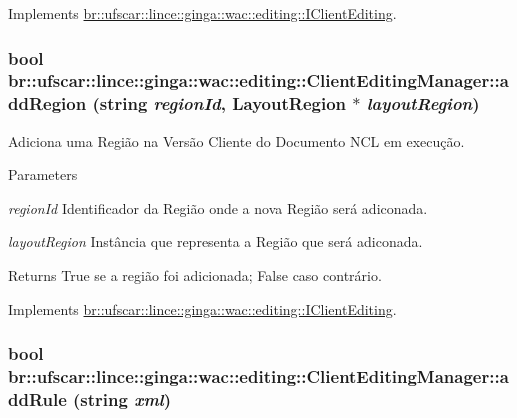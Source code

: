 Implements \hyperlink{classbr_1_1ufscar_1_1lince_1_1ginga_1_1wac_1_1editing_1_1IClientEditing_afaa30256c70e59a36820317d203869fc}{br::ufscar::lince::ginga::wac::editing::IClientEditing}.

\hypertarget{classbr_1_1ufscar_1_1lince_1_1ginga_1_1wac_1_1editing_1_1ClientEditingManager_a554a556985da2aaa32fe3c705d957705}{
\subsubsection[{addRegion}]{\setlength{\rightskip}{0pt plus 5cm}bool br::ufscar::lince::ginga::wac::editing::ClientEditingManager::addRegion (string {\em regionId}, \/  LayoutRegion $\ast$ {\em layoutRegion})}}
\label{classbr_1_1ufscar_1_1lince_1_1ginga_1_1wac_1_1editing_1_1ClientEditingManager_a554a556985da2aaa32fe3c705d957705}


Adiciona uma Região na Versão Cliente do Documento NCL em execução. 


\begin{DoxyParams}{Parameters}
\item[{\em regionId}]Identificador da Região onde a nova Região será adiconada. \item[{\em layoutRegion}]Instância que representa a Região que será adiconada. \end{DoxyParams}
\begin{DoxyReturn}{Returns}
True se a região foi adicionada; False caso contrário. 
\end{DoxyReturn}


Implements \hyperlink{classbr_1_1ufscar_1_1lince_1_1ginga_1_1wac_1_1editing_1_1IClientEditing_a159d8e1b676431ee5439ad932f07a6bd}{br::ufscar::lince::ginga::wac::editing::IClientEditing}.

\hypertarget{classbr_1_1ufscar_1_1lince_1_1ginga_1_1wac_1_1editing_1_1ClientEditingManager_abbf0ba0c717c55996fac349a88f78b6f}{
\subsubsection[{addRule}]{\setlength{\rightskip}{0pt plus 5cm}bool br::ufscar::lince::ginga::wac::editing::ClientEditingManager::addRule (string {\em xml})}}
\label{classbr_1_1ufscar_1_1lince_1_1ginga_1_1wac_1_1editing_1_1ClientEditingManager_abbf0ba0c717c55996fac349a88f78b6f}


